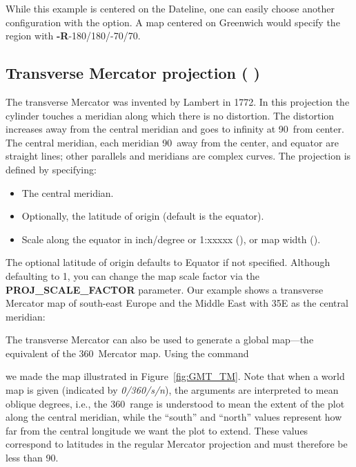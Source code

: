 While this example is centered on the Dateline, one can
easily choose another configuration with the  option.
A map centered on Greenwich would specify the region with
\textbf{-R}-180/180/-70/70. 


\subsection{Transverse Mercator projection ( )} 

The transverse Mercator was invented by Lambert in 1772.
In this projection the cylinder touches a meridian along
which there is no distortion.  The distortion increases away
from the central meridian and goes to infinity at 90\DS\ from
center.  The central meridian, each meridian 90\DS\ away
from the center, and equator are straight lines; other parallels
and meridians are complex curves.  The projection is defined
by specifying:

\begin{itemize} 
\item The central meridian.
\item Optionally, the latitude of origin (default is the equator).
\item Scale along the equator in inch/degree or 1:xxxxx (), or map width ().
\end{itemize} 

The optional latitude of origin defaults to Equator if not specified.
Although defaulting to 1, you can change the map scale factor via
the \textbf{PROJ\_SCALE\_FACTOR} parameter.
Our example shows a transverse Mercator map of south-east
Europe and the Middle East with 35\DS E as the central
meridian:


 
The transverse Mercator can also be used to generate a global map---the
equivalent of the 360\DS\ Mercator map.  Using the command


\noindent
we made the map illustrated in Figure~\ref{fig:GMT_TM}.  Note that
when a world map is given (indicated by \emph{0/360/s/n}), the arguments
are interpreted to mean oblique degrees, i.e., the 360\DS\ range is
understood to mean the extent of the plot along the central meridian,
while the ``south'' and ``north'' values represent how far from the
central longitude we want the plot to extend.  These values correspond
to latitudes in the regular Mercator projection and must therefore be
less than 90\DS.


